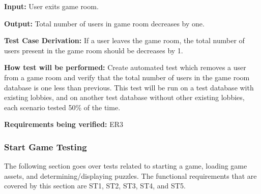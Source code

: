 \documentclass[12pt, titlepage]{article}
\begin{document}
\begin{enumerate}
\textbf{Input:} User exits game room.

\textbf{Output:} Total number of users in game room decreases by one.

\textbf{Test Case Derivation:} If a user leaves the game room, the total number of users present in the game room should be decreases by 1.

\textbf{How test will be performed:} Create automated test which removes a user from a game room and verify that the total number of users in the game room database is one less than previous. This test will be run on a test database with existing lobbies, and on another test database without other existing lobbies, each scenario tested 50\% of the time.

\textbf{Requirements being verified: } ER3

\end{enumerate}

\subsubsection{Start Game Testing}
The following section goes over tests related to starting a game, loading game assets, and determining/displaying puzzles. The functional requirements that are covered by this section are ST1, ST2, ST3, ST4, and ST5.
\end{document}
